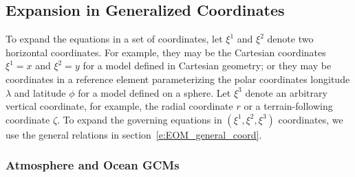 \documentclass{report}
\begin{document}
\subsection{Expansion in Generalized Coordinates}

To expand the equations in a set of coordinates, let $\xi^1$ and $\xi^2$ denote two horizontal coordinates. For example, they may be the Cartesian coordinates $\xi^1 = x$ and $\xi^2 =y$ for a model defined in Cartesian geometry; or they may be coordinates in a reference element parameterizing the polar coordinates longitude $\lambda$ and latitude $\phi$ for a model defined on a sphere. Let $\xi^3$ denote an arbitrary vertical coordinate, for example, the radial coordinate $r$ or a terrain-following coordinate $\zeta$. To expand the governing equations in $(\xi^1, \xi^2, \xi^3)$ coordinates, we use the general relations in section~\ref{e:EOM_general_coord}. 

\subsubsection{Atmosphere and Ocean GCMs}
\end{document}
